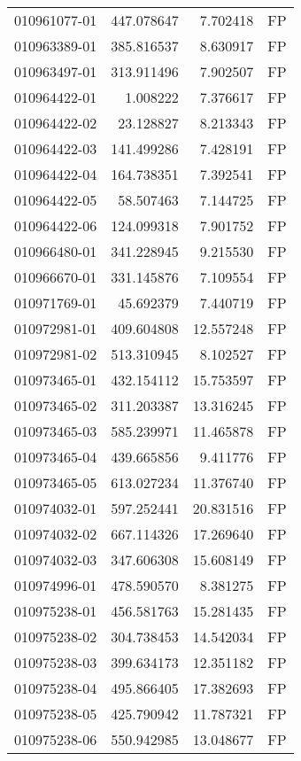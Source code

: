\begin{tabular}{lrrl}
010961077-01 &  447.078647 &     7.702418 &   FP \\
010963389-01 &  385.816537 &     8.630917 &   FP \\
010963497-01 &  313.911496 &     7.902507 &   FP \\
010964422-01 &    1.008222 &     7.376617 &   FP \\
010964422-02 &   23.128827 &     8.213343 &   FP \\
010964422-03 &  141.499286 &     7.428191 &   FP \\
010964422-04 &  164.738351 &     7.392541 &   FP \\
010964422-05 &   58.507463 &     7.144725 &   FP \\
010964422-06 &  124.099318 &     7.901752 &   FP \\
010966480-01 &  341.228945 &     9.215530 &   FP \\
010966670-01 &  331.145876 &     7.109554 &   FP \\
010971769-01 &   45.692379 &     7.440719 &   FP \\
010972981-01 &  409.604808 &    12.557248 &   FP \\
010972981-02 &  513.310945 &     8.102527 &   FP \\
010973465-01 &  432.154112 &    15.753597 &   FP \\
010973465-02 &  311.203387 &    13.316245 &   FP \\
010973465-03 &  585.239971 &    11.465878 &   FP \\
010973465-04 &  439.665856 &     9.411776 &   FP \\
010973465-05 &  613.027234 &    11.376740 &   FP \\
010974032-01 &  597.252441 &    20.831516 &   FP \\
010974032-02 &  667.114326 &    17.269640 &   FP \\
010974032-03 &  347.606308 &    15.608149 &   FP \\
010974996-01 &  478.590570 &     8.381275 &   FP \\
010975238-01 &  456.581763 &    15.281435 &   FP \\
010975238-02 &  304.738453 &    14.542034 &   FP \\
010975238-03 &  399.634173 &    12.351182 &   FP \\
010975238-04 &  495.866405 &    17.382693 &   FP \\
010975238-05 &  425.790942 &    11.787321 &   FP \\
010975238-06 &  550.942985 &    13.048677 &   FP \\

\end{tabular}
